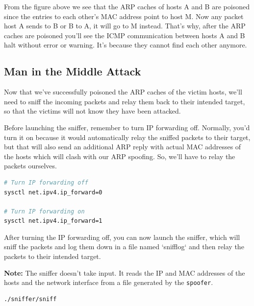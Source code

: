 \documentclass[12pt]{article}
\begin{document}
\vspace{1cm}

From the figure above we see that the ARP caches of hosts A and B are poisoned
since the entries to each other's MAC address point to host M. Now any packet
host A sends to B or B to A, it will go to M instead. That's why, after the ARP
caches are poisoned you'll see the ICMP communication between hosts A and B halt
without error or warning. It's because they cannot find each other anymore.

\vspace{1cm}

\subsection{Man in the Middle Attack}

Now that we've successfully poisoned the ARP caches of the victim hosts, we'll
need to sniff the incoming packets and relay them back to their intended target,
so that the victims will not know they have been attacked.

Before launching the sniffer, remember to turn IP forwarding off. Normally,
you'd turn it on because it would automatically relay the sniffed packets to
their target, but that will also send an additional ARP reply with actual MAC
addresses of the hosts which will clash with our ARP spoofing. So, we'll have to
relay the packets ourselves.

\vspace{1cm}

\begin{lstlisting}[language=bash,caption={Ip fowarding},captionpos=b]
# Turn IP forwarding off
sysctl net.ipv4.ip_forward=0

# Turn IP forwarding on
sysctl net.ipv4.ip_forward=1
\end{lstlisting}

\vspace{1cm}

After turning the IP forwarding off, you can now launch the sniffer, which will
sniff the packets and log them down in a file named `snifflog` and then relay
the packets to their intended target.

{\bf Note:} The sniffer doesn't take input. It reads the IP and MAC addresses of
the hosts and the network interface from a file generated by the \verb|spoofer|.

\vspace{1cm}
\begin{lstlisting}[language=bash,caption={Start sniffing},captionpos=b]
./sniffer/sniff
\end{lstlisting}
\vspace{1cm}
\end{document}
